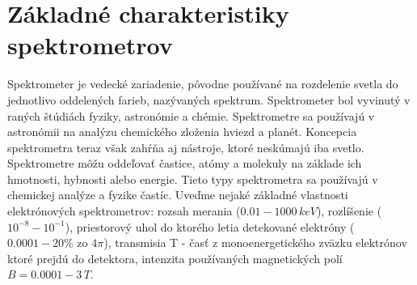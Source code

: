 \documentclass[../../main.tex]{subfiles}
\begin{document}
\chapter{Základné charakteristiky spektrometrov}
Spektrometer je vedecké zariadenie, pôvodne používané na rozdelenie svetla do jednotlivo oddelených farieb, nazývaných spektrum. Spektrometer bol vyvinutý v raných štúdiách fyziky, astronómie a chémie. Spektrometre sa používajú v astronómii na analýzu chemického zloženia hviezd a planét. Koncepcia spektrometra teraz však zahŕňa aj nástroje, ktoré neskúmajú iba svetlo. Spektrometre môžu oddeľovať častice, atómy a molekuly na základe ich hmotnosti, hybnosti alebo energie. Tieto typy spektrometra sa používajú v chemickej analýze a fyzike častíc. Uveďme nejaké základné vlastnosti elektrónových spektrometrov: rozsah merania ($0.01-1000\,keV$), rozlíšenie ($10^{-8}-10^{-1}$), priestorový uhol do ktorého letia detekované elektróny ($0.0001-20 \% $ zo $4\pi$), transmisia T - časť z monoenergetického zväzku elektrónov ktoré prejdú do detektora, intenzita používaných magnetických polí $B=0.0001-3\,T$.
\end{document}
